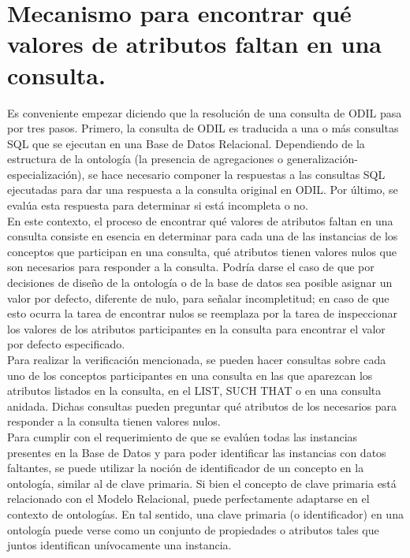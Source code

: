 \section{Mecanismo para encontrar qué valores de atributos faltan en una consulta.}\label{section-mecanismoEncontrarValoresFaltantes}

Es conveniente empezar diciendo que la resolución de una consulta de ODIL pasa por tres pasos. Primero, la consulta de ODIL es traducida a una o más consultas SQL que se ejecutan en una Base de Datos Relacional. Dependiendo de la estructura de la ontología (la presencia de agregaciones o generalización-especialización), se hace necesario componer la respuestas a las consultas SQL ejecutadas para dar una respuesta a la consulta original en ODIL. Por último, se evalúa esta respuesta para determinar si está incompleta o no. \\

En este contexto, el proceso de encontrar qué valores de atributos faltan en una consulta consiste en esencia en determinar para cada una de las instancias de los conceptos que participan en una consulta, qué atributos tienen valores nulos que son necesarios para responder a la consulta. Podría darse el caso de que por decisiones de diseño de la ontología o de la base de datos sea posible asignar un valor por defecto, diferente de nulo, para señalar incompletitud; en caso de que esto ocurra la tarea de encontrar nulos se reemplaza por la tarea de inspeccionar los valores de los atributos participantes en la consulta para encontrar el valor por defecto especificado. \\

Para realizar la verificación mencionada, se pueden hacer consultas sobre cada uno de los conceptos participantes en una consulta en las que aparezcan los atributos listados en la consulta, en el LIST, SUCH THAT o en una consulta anidada. Dichas consultas pueden preguntar qué atributos de los necesarios para responder a la consulta tienen valores nulos.\\

Para cumplir con el requerimiento de que se evalúen todas las instancias presentes en la Base de Datos y para poder identificar las instancias con datos faltantes, se puede utilizar la noción de identificador de un concepto en la ontología, similar al de clave primaria. Si bien el concepto de clave primaria está relacionado con el Modelo Relacional, puede perfectamente adaptarse en el contexto de ontologías. En tal sentido, una clave primaria (o identificador) en una ontología puede verse como un conjunto de propiedades o atributos tales que juntos identifican unívocamente una instancia. \\

